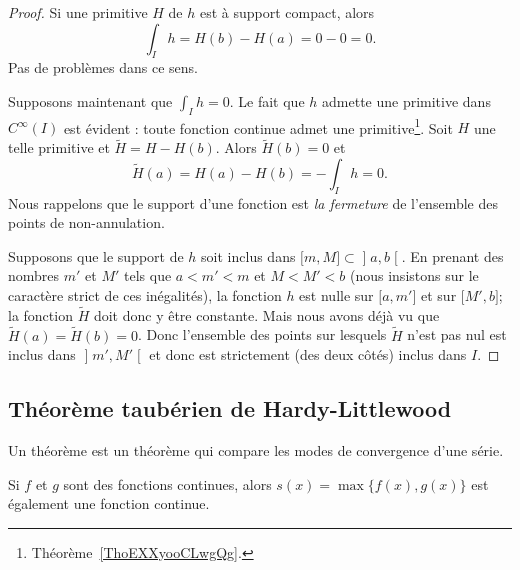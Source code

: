 \begin{proof}
	Si une primitive \( H\) de \( h\) est à support compact, alors
	\begin{equation}
		\int_Ih=H(b)-H(a)=0-0=0.
	\end{equation}
	Pas de problèmes dans ce sens.

	Supposons maintenant que \( \int_Ih=0\). Le fait que \( h\) admette une primitive dans \(  C^{\infty}(I)\) est évident : toute fonction continue admet une primitive\footnote{Théorème~\ref{ThoEXXyooCLwgQg}.}. Soit \( H\) une telle primitive et \( \tilde H=H-H(b)\). Alors \( \tilde H(b)=0\) et
	\begin{equation}
		\tilde H(a)=H(a)-H(b)=-\int_Ih=0.
	\end{equation}
	Nous rappelons que le support d'une fonction est \emph{la fermeture} de l'ensemble des points de non-annulation.

	Supposons que le support de \( h\) soit inclus dans \( \mathopen[ m , M \mathclose]\subset\mathopen] a , b \mathclose[\). En prenant des nombres \( m'\) et \( M'\) tels que \( a<m'<m\) et \( M<M'<b\) (nous insistons sur le caractère strict de ces inégalités), la fonction \( h\) est nulle sur \( \mathopen[ a , m' \mathclose]\) et sur \( \mathopen[ M' , b \mathclose]\); la fonction \( \tilde H\) doit donc y être constante. Mais nous avons déjà vu que \( \tilde H(a)=\tilde H(b)=0\). Donc l'ensemble des points sur lesquels \( \tilde H\) n'est pas nul est inclus dans \( \mathopen] m' , M' \mathclose[\) et donc est strictement (des deux côtés) inclus dans \( I\).
\end{proof}

\subsection{Théorème taubérien de Hardy-Littlewood}

Un théorème  est un théorème qui compare les modes de convergence d'une série.

\begin{lemma}
	Si \( f\) et \( g\) sont des fonctions continues, alors \( s(x)=\max\{ f(x),g(x) \}\) est également une fonction continue.
\end{lemma}

